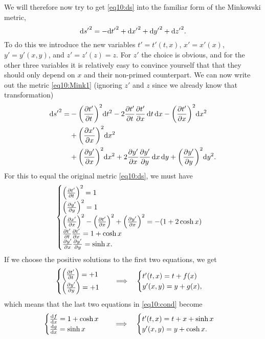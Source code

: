\documentclass[11pt,a4paper, 
swedish, english %
]{article}
\begin{document}
We will therefore now try to get \eqref{eq10:ds} into the familiar
form of the Minkowski metric,
\begin{equation}\label{eq10:Mink1}
\mathrm{d}{s'}^2=-\mathrm{d}{t'}^2+\mathrm{d}{x'}^2+\mathrm{d}{y'}^2+\mathrm{d}{z'}^2.
\end{equation}
To do this we introduce the new variables $t'=t'(t,x)$, $x'=x'(x)$,
$y'=y'(x,y)$, and $z'=z'(z)=z$. For $z'$ the choice is obvious, and
for the other three variables it is relatively easy to convince
yourself that that they should only depend on $x$ and their non-primed
counterpart. We can now write out the metric \eqref{eq10:Mink1}
(ignoring $z'$ and $z$ since we already know that transformation) 
\begin{equation}%
\begin{aligned}
\rd{s'}^2=&
-\qty(\pdv{t'}{t})^2\rd{t}^2-2\pdv{t'}{t}\pdv{t'}{x}\id{t}\id{x}
-\qty(\pdv{t'}{x})^2\rd{x}^2\\
&+\qty(\pdv{x'}{x})^2\rd{x}^2\\
&+\qty(\pdv{y'}{x})^2\rd{x}^2+2\pdv{y'}{x}\pdv{y'}{y}\id{x}\id{y}
+\qty(\pdv{y'}{y})^2\rd{y}^2.
\end{aligned}
\end{equation}
For this to equal the original metric \eqref{eq10:ds}, we must have
\begin{equation}\label{eq10:cond}
\begin{cases}
\qty(\pdv{t'}{t})^2=1\\
\qty(\pdv{y'}{y})^2=1\\
\qty(\pdv{x'}{x})^2-\qty(\pdv{t'}{x})^2+\qty(\pdv{y'}{x})^2
=-(1+2\cosh x)\\
\pdv{t'}{t}\pdv{t'}{x}=1+\cosh x\\
\pdv{y'}{x}\pdv{y'}{y}=\sinh x.
\end{cases}
\end{equation}
If we choose the positive solutions to the first two equations, we get
\begin{equation}
\begin{cases}
\qty(\pdv{t'}{t})=+1\\
\qty(\pdv{y'}{y})=+1\\
\end{cases}
\quad\Longrightarrow\quad
\begin{cases}
t'(t,x)=t+f(x)\\
y'(x,y)=y+g(x),
\end{cases}
\end{equation}
which means that the last two equations in \eqref{eq10:cond} become
\begin{equation}
\begin{cases}
\dv{f}{x}=1+\cosh x\\
\dv{g}{x}=\sinh x
\end{cases}
\quad\Longrightarrow\quad
\begin{cases}
t'(t,x)=t+x+\sinh x\\
y'(x,y)=y+\cosh x.
\end{cases}
\end{equation}
\end{document}
